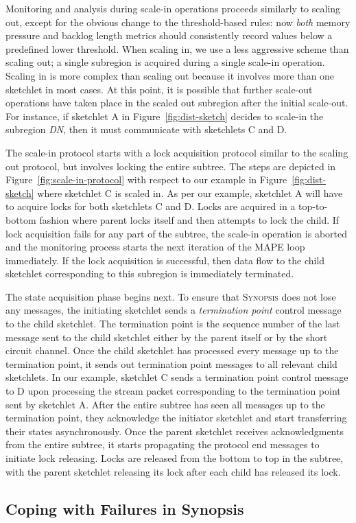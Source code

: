 Monitoring and analysis during scale-in operations proceeds similarly to scaling out, except for the obvious change to the threshold-based rules: now \textit{both} memory pressure and backlog length metrics should consistently record values below a predefined lower threshold.
When scaling in, we use a less aggressive scheme than scaling out; a single subregion is acquired during a single scale-in operation.
Scaling in is more complex than scaling out because it involves more than one sketchlet in most cases.
At this point, it is possible that further scale-out operations have taken place in the scaled out subregion after the initial scale-out.
For instance, if sketchlet A in Figure~\ref{fig:dist-sketch} decides to scale-in the subregion \emph{DN}, then it must communicate with sketchlets C and D.

The scale-in protocol starts with a lock acquisition protocol similar to the scaling out protocol, but involves locking the entire subtree.
The steps are depicted in Figure~\ref{fig:scale-in-protocol} with respect to our example in Figure~\ref{fig:dist-sketch} where sketchlet C is scaled in.
As per our example, sketchlet A will have to acquire locks for both sketchlets C and D.
Locks are acquired in a top-to-bottom fashion where parent locks itself and then attempts to lock the child.
If lock acquisition fails for any part of the subtree, the scale-in operation is aborted and the monitoring process starts the next iteration of the MAPE loop immediately.
If the lock acquisition is successful, then data flow to the child sketchlet corresponding to this subregion is immediately terminated.

The state acquisition phase begins next.
To ensure that \textsc{Synopsis} does not lose any messages, the initiating sketchlet sends a \emph{termination point} control message to the child sketchlet.
The termination point is the sequence number of the last message sent to the child sketchlet either by the parent itself or by the short circuit channel.
Once the child sketchlet has processed every message up to the termination point, it sends out termination point messages to all relevant child sketchlets. In our example, sketchlet C sends a termination point control message to D upon processing the stream packet corresponding to the termination point sent by sketchlet A.
After the entire subtree has seen all messages up to the termination point, they acknowledge the initiator sketchlet and start transferring their states asynchronously.
Once the parent sketchlet receives acknowledgments from the entire subtree, it starts propagating the protocol end messages to initiate lock releasing.
Locks are released from the bottom to top in the subtree, with the parent sketchlet releasing its lock after each child has released its lock.
%

\subsection{Coping with Failures in Synopsis}



